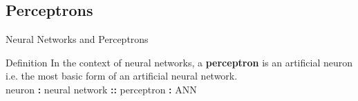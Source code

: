 \documentclass[10pt]{beamer}
\begin{document}
	\subsection{Perceptrons}
	\begin{frame}{Neural Networks and Perceptrons}
		\begin{block}{Definition}
			In the context of neural networks, a \textbf{perceptron} is an artificial neuron i.e. the most basic form of an artificial neural network.\\
			\alert{neuron \textbf{:} neural network \textbf{::} perceptron \textbf{:} ANN}
		\end{block}
	\end{frame}
\end{document}
